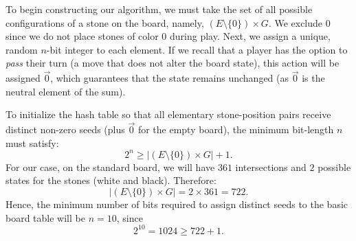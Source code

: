 To begin constructing our algorithm, we must take the set of all possible configurations of a stone on the board, namely, $(E \setminus \{0\}) \times G$.
We exclude $0$ since we do not place stones of color $0$ during play. Next, we assign a unique, random $n$-bit integer to each element. If we recall that a player has the option to \textit{pass} their turn (a move that does not alter the board state), this action will be assigned $\vec{0}$, which guarantees that the state remains unchanged (as $\vec{0}$ is the neutral element of the sum).

To initialize the hash table so that all elementary stone-position pairs receive distinct non-zero seeds (plus $\vec{0}$ for the empty board), the minimum bit-length $n$ must satisfy:
\[ 2^n \geq |(E \setminus \{0\}) \times G| + 1. \]
For our case, on the standard board, we will have $361$ intersections and $2$ possible states for the stones (white and black). 
Therefore:
$$|(E\setminus\{0\}) \times G| = 2 \times 361 = 722.$$
Hence, the minimum number of bits required to assign distinct seeds to the basic board table will be $n = 10$, since
$$2^{10} = 1024 \geq 722 + 1.$$

